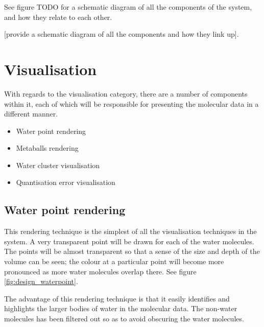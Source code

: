 See figure TODO for a schematic diagram of all the components of the system,
and how they relate to each other.

[provide a schematic diagram of all the components and how they link up].


\section{Visualisation}
\label{sec:design_visualisation}


With regards to the visualisation category, there are a number of components
within it, each of which will be responsible for presenting the molecular data
in a different manner.

\begin{itemize}
  \item Water point rendering
  \item Metaballs rendering
  \item Water cluster visualisation
  \item Quantisation error visualisation
\end{itemize}


\subsection{Water point rendering}
\label{sub:design_waterpoint}

This rendering technique is the simplest of all the visualisation techniques in
the system. A very transparent point will be drawn for each of the water
molecules. The points will be almost transparent so that a sense of the size
and depth of the volume can be seen; the colour at a particular point will
become more pronounced as more water molecules overlap there. See figure
\ref{fig:design_waterpoint}.

The advantage of this rendering technique is that it easily identifies and
highlights the larger bodies of water in the molecular data. The non-water
molecules has been filtered out so as to avoid obscuring the water molecules.

